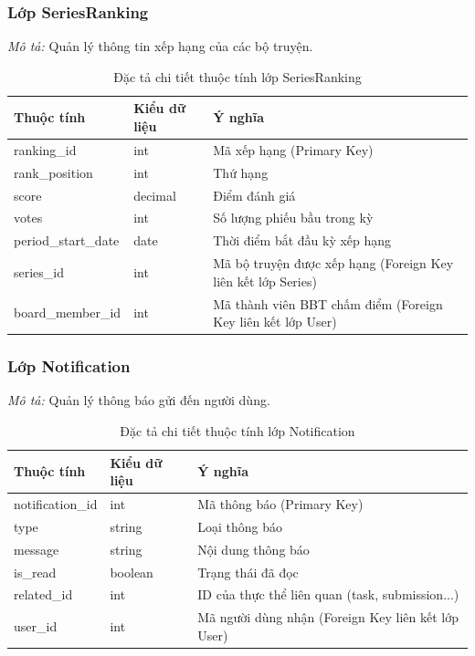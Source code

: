 \subsubsection{Lớp SeriesRanking}
\textit{Mô tả:} Quản lý thông tin xếp hạng của các bộ truyện.

\begin{table}[H]
\centering
\renewcommand{\arraystretch}{1.3}
\begin{tabularx}{\textwidth}{|p{4cm}|p{3cm}|>{\raggedright\arraybackslash}X|}
\hline
\rowcolor{tableheader}
\textbf{Thuộc tính} & \textbf{Kiểu dữ liệu} & \textbf{Ý nghĩa} \\ \hline
ranking\_id & int & Mã xếp hạng (Primary Key) \\ \hline
rank\_position & int & Thứ hạng \\ \hline
score & decimal & Điểm đánh giá \\ \hline
votes & int & Số lượng phiếu bầu trong kỳ \\ \hline
period\_start\_date & date & Thời điểm bắt đầu kỳ xếp hạng \\ \hline
series\_id & int & Mã bộ truyện được xếp hạng (Foreign Key liên kết lớp Series) \\ \hline
board\_member\_id & int & Mã thành viên BBT chấm điểm (Foreign Key liên kết lớp User) \\ \hline
\end{tabularx}
\caption{Đặc tả chi tiết thuộc tính lớp SeriesRanking}
\label{tab:class_seriesranking}
\end{table}


\subsubsection{Lớp Notification}
\textit{Mô tả:} Quản lý thông báo gửi đến người dùng.

\begin{table}[H]
\centering
\renewcommand{\arraystretch}{1.3}
\begin{tabularx}{\textwidth}{|p{4cm}|p{3cm}|>{\raggedright\arraybackslash}X|}
\hline
\rowcolor{tableheader}
\textbf{Thuộc tính} & \textbf{Kiểu dữ liệu} & \textbf{Ý nghĩa} \\ \hline
notification\_id & int & Mã thông báo (Primary Key) \\ \hline
type & string & Loại thông báo \\ \hline
message & string & Nội dung thông báo \\ \hline
is\_read & boolean & Trạng thái đã đọc \\ \hline
related\_id & int & ID của thực thể liên quan (task, submission...) \\ \hline
user\_id & int & Mã người dùng nhận (Foreign Key liên kết lớp User) \\ \hline
\end{tabularx}
\caption{Đặc tả chi tiết thuộc tính lớp Notification}
\label{tab:class_notification}
\end{table}


